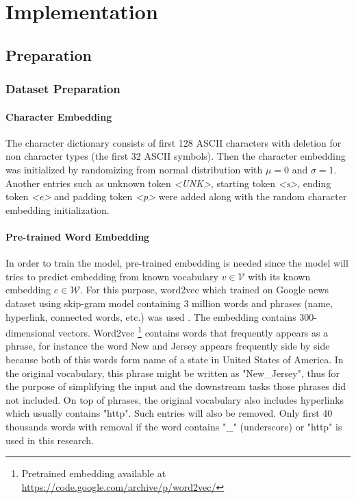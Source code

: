 \chapter{Implementation}
\label{chap:implementation}

\section{Preparation}
    \subsection{Dataset Preparation}
        \subsubsection{Character Embedding}
            The character dictionary consists of first 128 ASCII
            characters with deletion for non character types (the
            first 32 ASCII symbols). Then the character embedding was
            initialized by randomizing from normal distribution with
            $\mu = 0$ and $\sigma = 1$. Another entries such as
            unknown token \textit{\textless UNK\textgreater}, starting
            token \textit{\textless s\textgreater}, ending token
            \textit{\textless e\textgreater} and padding token
            \textit{\textless p\textgreater} were added along with the
            random character embedding initialization.

        \subsubsection{Pre-trained Word Embedding}
            In order to train the model, pre-trained embedding is
            needed since the model will tries to predict embedding
            from known vocabulary $v \in \mathcal{V}$ with its known
            embedding $e \in \mathcal{W}$. For this purpose, word2vec
            which trained on Google news dataset using skip-gram model
            containing 3 million words and phrases (name, hyperlink,
            connected words, etc.) was used
            \citep{Distributed2013mikolov}. The embedding contains
            300-dimensional vectors. Word2vec \footnote{Pretrained
            embedding available at 
            \url{https://code.google.com/archive/p/word2vec/}}
            contains words that frequently appears as a phrase, for
            instance the word New and Jersey appears frequently side
            by side because both of this words form name of a state in
            United States of America. In the original vocabulary, this
            phrase might be written as "New\_Jersey", thus for the
            purpose of simplifying the input and the downstream tasks
            those phrases did not included. On top of phrases, the
            original vocabulary also includes hyperlinks which usually
            contains "http". Such entries will also be removed. Only
            first 40 thousands words with removal if the word contains
            "\_" (underscore) or "http" is used in this research.
            
